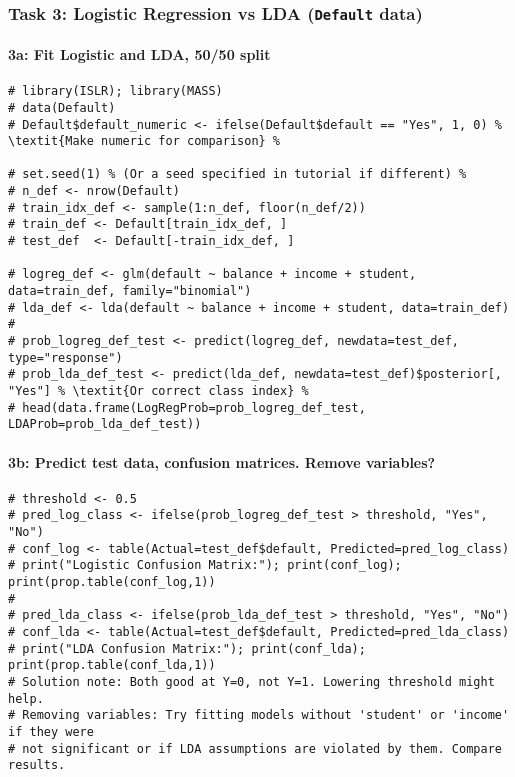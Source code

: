 \documentclass[12pt,a4paper]{article}
\newcommand{\Robject}[1]{\texttt{#1}} %
\begin{document}
        \subsubsection{Task 3: Logistic Regression vs LDA (\Robject{Default} data)}
            \paragraph{3a: Fit Logistic and LDA, 50/50 split}
\begin{lstlisting}
# library(ISLR); library(MASS)
# data(Default)
# Default$default_numeric <- ifelse(Default$default == "Yes", 1, 0) % \textit{Make numeric for comparison} %

# set.seed(1) % (Or a seed specified in tutorial if different) %
# n_def <- nrow(Default)
# train_idx_def <- sample(1:n_def, floor(n_def/2))
# train_def <- Default[train_idx_def, ]
# test_def  <- Default[-train_idx_def, ]

# logreg_def <- glm(default ~ balance + income + student, data=train_def, family="binomial")
# lda_def <- lda(default ~ balance + income + student, data=train_def)
#
# prob_logreg_def_test <- predict(logreg_def, newdata=test_def, type="response")
# prob_lda_def_test <- predict(lda_def, newdata=test_def)$posterior[, "Yes"] % \textit{Or correct class index} %
# head(data.frame(LogRegProb=prob_logreg_def_test, LDAProb=prob_lda_def_test))
\end{lstlisting}
            \paragraph{3b: Predict test data, confusion matrices. Remove variables?}
\begin{lstlisting}
# threshold <- 0.5
# pred_log_class <- ifelse(prob_logreg_def_test > threshold, "Yes", "No")
# conf_log <- table(Actual=test_def$default, Predicted=pred_log_class)
# print("Logistic Confusion Matrix:"); print(conf_log); print(prop.table(conf_log,1))
# 
# pred_lda_class <- ifelse(prob_lda_def_test > threshold, "Yes", "No")
# conf_lda <- table(Actual=test_def$default, Predicted=pred_lda_class)
# print("LDA Confusion Matrix:"); print(conf_lda); print(prop.table(conf_lda,1))
# Solution note: Both good at Y=0, not Y=1. Lowering threshold might help.
# Removing variables: Try fitting models without 'student' or 'income' if they were
# not significant or if LDA assumptions are violated by them. Compare results.
\end{lstlisting}
\end{document}

